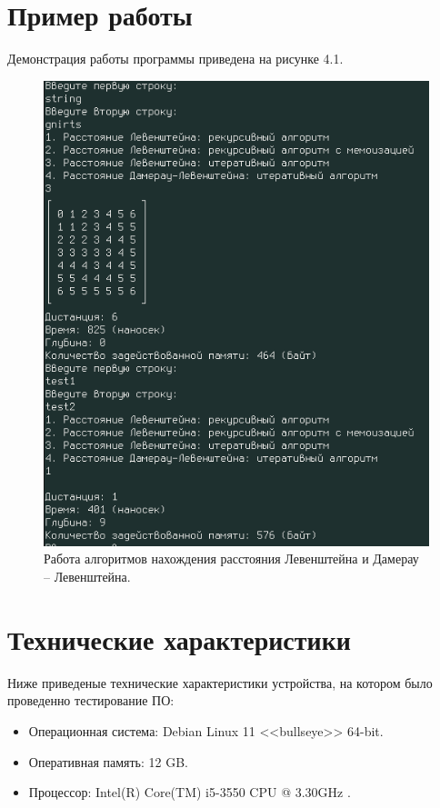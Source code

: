 \documentclass[12pt]{report}
\begin{document}
\section{Пример работы}

Демонстрация работы программы приведена на рисунке 4.1.

\begin{figure}[h]
	\begin{center}
	\includegraphics[scale=0.7]{primer.png}
	 \caption{Работа алгоритмов нахождения расстояния Левенштейна и Дамерау -- Левенштейна.}
	\end{center}
\end{figure}

\section{Технические характеристики}

Ниже приведеные технические характеристики устройства, на котором было проведенно тестирование ПО:

\begin{itemize}

	\item Операционная система: Debian \cite{debian} Linux \cite{linux} 11 <<bullseye>> 64-bit.

	\item Оперативная память: 12 GB.

	\item Процессор: Intel(R) Core(TM) i5-3550 CPU @ 3.30GHz
\cite{i5}.

\end{itemize}
\end{document}

